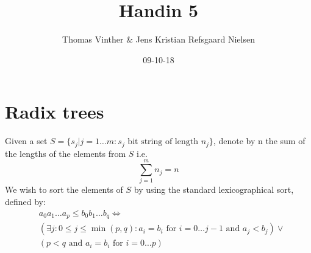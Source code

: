 \documentclass{article}
\theoremstyle{remark}
\numberwithin{equation}{section}
\begin{document}
	\author{Thomas Vinther \& Jens Kristian Refsgaard Nielsen}
	\title{Handin 5}
	\date{09-10-18}
	\maketitle
\section{Radix trees}
Given a set $S= \{s_j | j=1\dots m : s_j \text{ bit string of length }n_j \}$, denote by n the sum of the lengths of the elements from $S$ i.e. 
\begin{equation}\label{n}
	\sum_{j=1}^{m} n_j = n
\end{equation}
We wish to sort the elements of $S$ by using the standard lexicographical sort, defined by:
\begin{align}
	&a_0a_1\dots a_p \leq b_0b_1\dots b_q \iff\\
	&(\exists j: 0\leq j\leq \min(p,q) : a_i = b_i \text{ for }i=0\dots j-1 \text{ and } a_j < b_j) \vee \\
	&(p<q \text{ and } a_i = b_i \text{ for } i=0\dots p)
\end{align}
\end{document}
